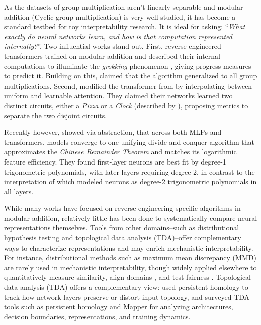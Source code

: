 \documentclass{article} %
\theoremstyle{plain}
\theoremstyle{definition}
\newtheorem{empirical fact}[theorem]{Empirical Fact}
\begin{document}
As the datasets of group multiplication aren't linearly separable and modular addition (Cyclic group multiplication) is very well studied, it has become a standard testbed for toy interpretability research. It is ideal for asking: ``\textit{What exactly do neural networks learn, and how is that computation represented internally?}''. Two influential works stand out. First, \cite{nanda2023progress} reverse-engineered transformers trained on modular addition and described their internal computations to illuminate the \textit{grokking} phenomenon \citep{power2022grokkinggeneralizationoverfittingsmall}, giving progress measures to predict it. Building on this, \cite{chughtai2023toy} claimed that the algorithm generalized to all group multiplications. Second, \cite{zhong2023the} modified the transformer from \cite{nanda2023progress} by interpolating between uniform and learnable attention. They claimed their networks learned two distinct circuits, either a \textit{Pizza} or a \textit{Clock} (described by \cite{nanda2023progress}), proposing metrics to separate the two disjoint circuits.

Recently however, \cite{mccracken2025uncoveringuniversalabstractalgorithm} showed via abstraction, that across both MLPs and transformers, models converge to one unifying divide-and-conquer algorithm that approximates the \textit{Chinese Remainder Theorem} and matches its logarithmic feature efficiency. They found first-layer neurons are best fit by degree-1 trigonometric polynomials, with later layers requiring degree-2, in contrast to the interpretation of \cite{nanda2023progress} which modeled neurons as degree-2 trigonometric polynomials in all layers.


While many works have focused on reverse-engineering specific algorithms in modular addition, relatively little has been done to systematically compare neural representations themselves. Tools from other domains--such as distributional hypothesis testing and topological data analysis (TDA)--offer complementary ways to characterize representations and may enrich mechanistic interpretability.
For instance, distributional methods such as maximum mean discrepancy (MMD) \cite{gretton2012kernel} are rarely used in mechanistic interpretability, though widely applied elsewhere to quantitatively measure similarity, align domains \cite{ghifary2014domain, zhao2019learning}, and test fairness \cite{deka2023mmd, kong2025fair}. Topological data analysis (TDA) offers a complementary view: \cite{shahidullah2022topologicaldataanalysisneural} used persistent homology to track how network layers preserve or distort input topology, and \cite{ballester2024topologicaldataanalysisneural} surveyed TDA tools such as persistent homology and Mapper for analyzing architectures, decision boundaries, representations, and training dynamics.
\end{document}
